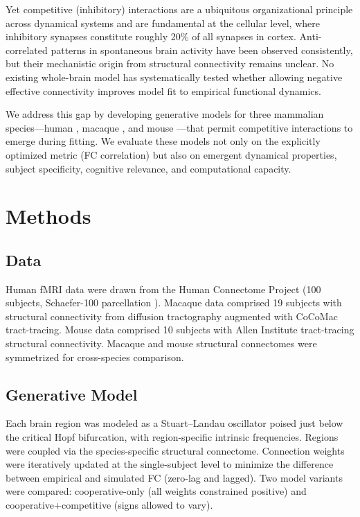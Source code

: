 \documentclass[11pt]{article}
\begin{document}
Yet competitive (inhibitory) interactions are a ubiquitous organizational principle across dynamical systems and are fundamental at the cellular level, where inhibitory synapses constitute roughly 20\% of all synapses in cortex. Anti-correlated patterns in spontaneous brain activity have been observed consistently, but their mechanistic origin from structural connectivity remains unclear. No existing whole-brain model has systematically tested whether allowing negative effective connectivity improves model fit to empirical functional dynamics.

We address this gap by developing generative models for three mammalian species---human \citep{vanessen2013wuminn}, macaque \citep{markov2014weighted}, and mouse \citep{oh2014mesoscale}---that permit competitive interactions to emerge during fitting. We evaluate these models not only on the explicitly optimized metric (FC correlation) but also on emergent dynamical properties, subject specificity, cognitive relevance, and computational capacity.

\section{Methods}

\subsection{Data}

Human fMRI data were drawn from the Human Connectome Project (100 subjects, Schaefer-100 parcellation \citep{schaefer2018local}). Macaque data comprised 19 subjects with structural connectivity from diffusion tractography augmented with CoCoMac tract-tracing. Mouse data comprised 10 subjects with Allen Institute tract-tracing structural connectivity. Macaque and mouse structural connectomes were symmetrized for cross-species comparison.

\subsection{Generative Model}

Each brain region was modeled as a Stuart--Landau oscillator poised just below the critical Hopf bifurcation, with region-specific intrinsic frequencies. Regions were coupled via the species-specific structural connectome. Connection weights were iteratively updated at the single-subject level to minimize the difference between empirical and simulated FC (zero-lag and lagged). Two model variants were compared: cooperative-only (all weights constrained positive) and cooperative+competitive (signs allowed to vary).
\end{document}
